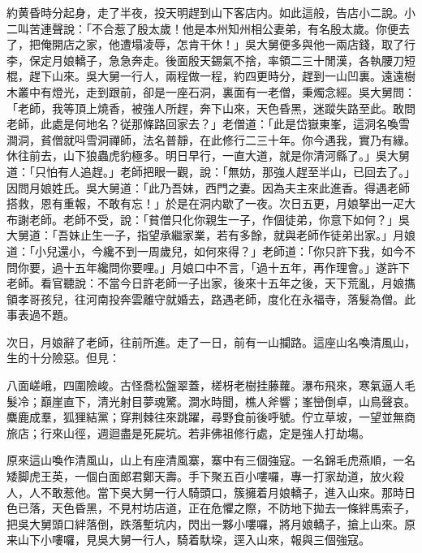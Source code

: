 約黄昏時分起身，走了半夜，投天明趕到山下客店内。如此這般，告店小二說。小二叫苦連聲說：「不合惹了殷太歲！他是本州知州相公妻弟，有名殷太歲。你便去了，把俺開店之家，他遭塌凌辱，怎肯干休！」吳大舅便多與他一兩店錢，取了行李，保定月娘轎子，急急奔走。後面殷天錫氣不捨，率領二三十閒漢，各執腰刀短棍，趕下山來。吳大舅一行人，兩程做一程，約四更時分，趕到一山凹裏。遠遠樹木叢中有燈光，走到跟前，卻是一座石洞，裏面有一老僧，秉燭念經。吳大舅問：「老師，我等頂上燒香，被強人所趕，奔下山來，天色昏黑，迷蹤失路至此。敢問老師，此處是何地名？従那條路回家去？」老僧道：「此是岱嶽東峯，這洞名喚雪澗洞，貧僧就呌雪洞禪師，法名普靜，在此修行二三十年。你今遇我，實乃有緣。休往前去，山下狼蟲虎豹極多。明日早行，一直大道，就是你清河縣了。」吳大舅道：「只怕有人追趕。」老師把眼一觀，說：「無妨，那強人趕至半山，已回去了。」因問月娘姓氏。吳大舅道：「此乃吾妹，西門之妻。因為夫主來此進香。得遇老師搭救，恩有重報，不敢有忘！」於是在洞内歇了一夜。次日五更，月娘拏出一疋大布謝老師。老師不受，說：「貧僧只化你親生一子，作個徒弟，你意下如何？」吳大舅道：「吾妹止生一子，指望承繼家業，若有多餘，就與老師作徒弟出家。」月娘道：「小兒還小，今纔不到一周歲兒，如何來得？」老師道：「你只許下我，如今不問你要，過十五年纔問你要哩。」月娘口中不言，「過十五年，再作理會。」遂許下老師。看官聽說：不當今日許老師一子出家，後來十五年之後，天下荒亂，月娘㩦領孝哥孩兒，往河南投奔雲離守就婚去，路遇老師，度化在永福寺，落髮為僧。此事表過不題。

次日，月娘辭了老師，往前所進。走了一日，前有一山攔路。這座山名喚清風山，生的十分險惡。但見：

\begin{myquote}
八面嵯峨，四圍險峻。古怪喬松盤翠蓋，槎枒老樹挂藤蘿。瀑布飛來，寒氣逼人毛髮冷；巔崖直下，清光射目夢魂驚。澗水時聞，樵人斧響；峯巒倒卓，山鳥聲哀。麋鹿成羣，狐狸結黨；穿荆棘往來跳躍，尋野食前後呼號。佇立草坡，一望並無商旅店；行來山徑，週迴盡是死屍坑。若非佛祖修行處，定是強人打劫塲。
\end{myquote}

原來這山喚作清風山，山上有座清風寨，寨中有三個強寇。一名錦毛虎燕順，一名矮脚虎王英，一個白面郎君鄭天壽。手下聚五百小嘍囉，專一打家劫道，放火殺人，人不敢惹他。當下吳大舅一行人騎頭口，簇擁着月娘轎子，進入山來。那時日色已落，天色昏黑，不見村坊店道，正在危懼之際，不防地下拋去一條絆馬索子，把吳大舅頭口絆落倒，跌落塹坑内，閃出一夥小嘍囉，將月娘轎子，搶上山來。原来山下小嘍囉，見吳大舅一行人，騎着馱垜，逕入山來，報與三個強寇。


